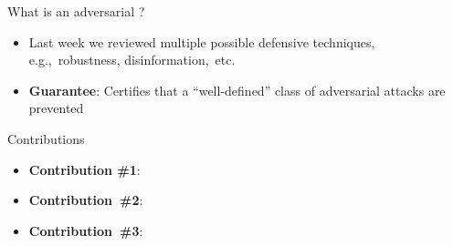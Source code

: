 
\begin{frame}{What is an adversarial ?}
  \begin{itemize}
    \item Last week we reviewed multiple possible defensive techniques, e.g.,~robustness, disinformation,~etc.
    \item \textbf{Guarantee}: Certifies that a ``well-defined'' class of adversarial attacks are prevented
  \end{itemize}
\end{frame}

\begin{frame}{Contributions}
  \begin{itemize}
    \item \textbf{Contribution \#1}:
    \item \textbf{Contribution~\#2}:
    \item \textbf{Contribution~\#3}:
  \end{itemize}
\end{frame}

